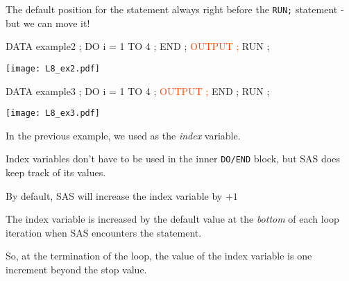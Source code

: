 \begin{frame}[fragile]
The default position for the   statement always right before the \texttt{RUN;} statement - but we can move it!
\vskip10pt
\footnotesize

\footnotesize
\begin{code}{.0}
DATA example2 ;
    DO i = 1 TO 4 ;
    END ;
    \textcolor{OrangeRed}{OUTPUT ;}
RUN ;
\end{code}
\begin{center}
\texttt{[image: L8\_ex2.pdf]}
\end{center}
\emp
{}\hspace{1in}\emp
{}
\begin{code}{.0}
DATA example3 ;
    DO i = 1 TO 4 ;
        \textcolor{OrangeRed}{OUTPUT ;}
    END ;
RUN ;
\end{code}
\begin{center}
\texttt{[image: L8\_ex3.pdf]}
\end{center}
\emp
\end{frame}


\begin{frame}
\bi
\item In the previous example, we used  as the \emph{index} variable.
\item Index variables don't have to be used in the inner \texttt{DO/END} block, but SAS does keep track of its values.
\item By default, SAS will increase the index variable by $+1$
\item The index variable is increased by the default value at the \emph{bottom} of each loop iteration when SAS encounters the  statement.
\item So, at the termination of the loop, the value of the index variable is one increment beyond the stop value.
\ei
\end{frame}



